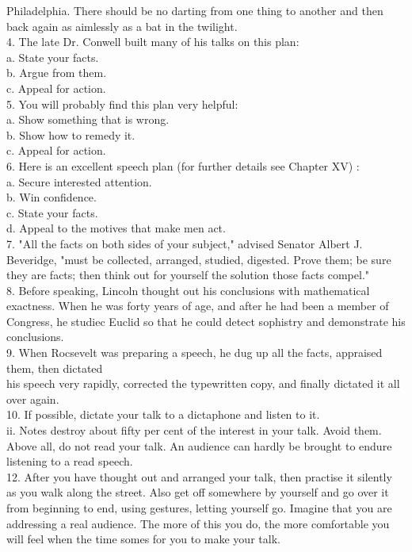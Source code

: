 \documentclass[10pt]{article}
\begin{document}
Philadelphia. There should be no darting from one thing to another and then back again as aimlessly as a bat in the twilight.\\
4. The late Dr. Conwell built many of his talks on this plan:\\
a. State your facts.\\
b. Argue from them.\\
c. Appeal for action.\\
5. You will probably find this plan very helpful:\\
a. Show something that is wrong.\\
b. Show how to remedy it.\\
c. Appeal for action.\\
6. Here is an excellent speech plan (for further details see Chapter XV) :\\
a. Secure interested attention.\\
b. Win confidence.\\
c. State your facts.\\
d. Appeal to the motives that make men act.\\
7. "All the facts on both sides of your subject," advised Senator Albert J. Beveridge, "must be collected, arranged, studied, digested. Prove them; be sure they are facts; then think out for yourself the solution those facts compel."\\
8. Before speaking, Lincoln thought out his conclusions with mathematical exactness. When he was forty years of age, and after he had been a member of Congress, he studiec Euclid so that he could detect sophistry and demonstrate his conclusions.\\
9. When Rocsevelt was preparing a speech, he dug up all the facts, appraised them, then dictated\\
his speech very rapidly, corrected the typewritten copy, and finally dictated it all over again.\\
10. If possible, dictate your talk to a dictaphone and listen to it.\\
ii. Notes destroy about fifty per cent of the interest in your talk. Avoid them. Above all, do not read your talk. An audience can hardly be brought to endure listening to a read speech.\\
12. After you have thought out and arranged your talk, then practise it silently as you walk along the street. Also get off somewhere by yourself and go over it from beginning to end, using gestures, letting yourself go. Imagine that you are addressing a real audience. The more of this you do, the more comfortable you will feel when the time somes for you to make your talk.
\end{document}
